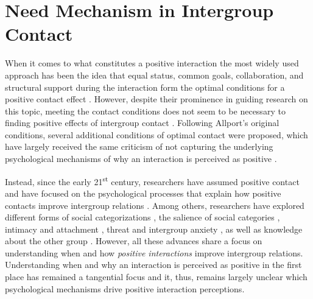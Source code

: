\documentclass[man, 12pt, a4paper, mask]{apa7}
\theoremstyle{break}
\theoremstyle{plain}
\providecommand{\DIFdelbegin}{} %
\providecommand{\DIFdelend}{} %
\newcommand{\DIFscaledelfig}{0.5}
\newlength{\DIFdelgraphicswidth} %
\newlength{\DIFdelgraphicsheight} %
\newcommand{\DIFdelincludegraphics}[2][]{%
\sbox{\DIFdelgraphicsbox}{\DIFOincludegraphics[#1]{#2}}%
\settoboxwidth{\DIFdelgraphicswidth}{\DIFdelgraphicsbox} %
\settoboxtotalheight{\DIFdelgraphicsheight}{\DIFdelgraphicsbox} %
\scalebox{\DIFscaledelfig}{%
\parbox[b]{\DIFdelgraphicswidth}{\usebox{\DIFdelgraphicsbox}\\[-\baselineskip] \rule{\DIFdelgraphicswidth}{0em}}\llap{\resizebox{\DIFdelgraphicswidth}{\DIFdelgraphicsheight}{%
\setlength{\unitlength}{\DIFdelgraphicswidth}%
\begin{picture}(1,1)%
\thicklines\linethickness{2pt} %
{\color[rgb]{1,0,0}\put(0,0){\framebox(1,1){}}}%
{\color[rgb]{1,0,0}\put(0,0){\line( 1,1){1}}}%
{\color[rgb]{1,0,0}\put(0,1){\line(1,-1){1}}}%
\end{picture}%
}\hspace*{3pt}}} %
} %
\DeclareRobustCommand{\DIFdelbegin}{\DIFOdelbegin \let\includegraphics\DIFdelincludegraphics} %
\DeclareRobustCommand{\DIFdelend}{\DIFOaddend \let\includegraphics\DIFOincludegraphics} %
\begin{document}
\section{Need Mechanism in Intergroup Contact}
\DIFdelbegin %
\DIFdelend %
When it comes to what constitutes a positive interaction the most widely used approach has been the idea that equal status, common goals, collaboration, and structural support during the interaction form the optimal conditions for a positive contact effect \citep[][]{Allport1954b, Pettigrew1969}. However, despite their prominence in guiding research on this topic, meeting the contact conditions does not seem to be necessary to finding positive effects of intergroup contact \citep[][]{Pettigrew2006}. Following Allport's original conditions, several additional conditions of optimal contact were proposed, which have largely received the same criticism of not capturing the underlying psychological mechanisms of why an interaction is perceived as positive \citep[for a critical discussion see][]{Pettigrew1986}.

Instead, since the early 21\textsuperscript{st} century, researchers have assumed positive contact and have focused on the psychological processes that explain how positive contacts improve intergroup relations \citep[e.g. see,][]{Paolini2021}. Among others, researchers have explored different forms of social categorizations \citep[][]{Pettigrew1998}, the salience of social categories \citep[][]{Brown2005}, intimacy \citep[e.g.,][]{Marinucci2021} and attachment \citep[e.g.,][]{Tropp2021}, threat and intergroup anxiety \citep[e.g.,][]{Stephan2008}, as well as knowledge about the other group \citep[][]{Pettigrew2008c}. However, all these advances share a focus on understanding when and how \textit{positive interactions} improve intergroup relations. Understanding when and why an interaction is perceived as positive in the first place has remained a tangential focus and it, thus, remains largely unclear which psychological mechanisms drive positive interaction perceptions. 
\end{document}
